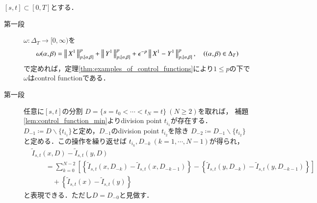	\begin{prf}
		$[s,t] \subset [0,T]$とする．
		\begin{description}
			\item[第一段]
				$\omega:\Delta_T \longrightarrow [0,\infty)$を
				\begin{align}
					\omega(\alpha,\beta) = \left\|\, X^1\, \right\|_{p,[\alpha,\beta]}^p + \left\|\, Y^1\, \right\|_{p,[\alpha,\beta]}^p + \epsilon^{-p} \left\|\, X^1 - Y^1\, \right\|_{p,[\alpha,\beta]}^p,
					\quad ((\alpha,\beta) \in \Delta_T)
				\end{align}
				で定めれば，定理\ref{thm:examples_of_control_functions}により$1 \leq p$の下で$\omega$はcontrol functionである．
				
			\item[第一段]
				任意に$[s,t]$の分割
				$D = \{s=t_0 < \cdots < t_N=t\}\ (N \geq 2)$を取れば，
				補題\ref{lem:control_function_min}よりdivision point $t_{i_1}$が存在する．
				$D_{-1} \coloneqq D \backslash \{t_{i_1}\}$と定め，$D_{-1}$のdivision point $t_{i_2}$を除き
				$D_{-2} \coloneqq D_{-1} \backslash \{t_{i_2}\}$と定める．この操作を繰り返せば
				$t_{i_k},D_{-k}\ (k=1,\cdots,N-1)$が得られ，
				\begin{align}
					&\tilde{I}_{s,t}(x,D) - \tilde{I}_{s,t}(y,D) \\
					&\qquad = \sum_{k=0}^{N-2} \left[ \left\{ \tilde{I}_{s,t}(x,D_{-k}) - \tilde{I}_{s,t}(x,D_{-k-1}) \right\} - 
						\left\{ \tilde{I}_{s,t}(y,D_{-k}) - \tilde{I}_{s,t}(y,D_{-k-1}) \right\} \right] \label{eq:continuity_theorem_1_1}\\
					&\quad \qquad + \left\{ \tilde{I}_{s,t}(x) - \tilde{I}_{s,t}(y) \right\}	\label{eq:continuity_theorem_1_2}
				\end{align}
				と表現できる．ただし$D = D_{-0}$と見做す．
			

\end{description}
\end{prf}
